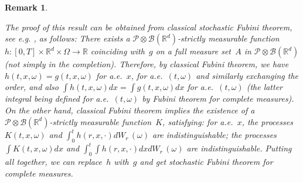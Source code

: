 \documentclass[a4paper,10pt]{article}
\newtheorem{remark}[theorem]{Remark}
\newcommand\1{\mathbbm{1}}
\newcommand{\mr}{\mathbb{R}}
\newcommand{\mc}{\mathcal}
\numberwithin{equation}{section}
\begin{document}
\begin{remark}
\begin{itemize}
\begin{itemize}
\end{itemize}
The proof of this result can be obtained from classical stochastic Fubini theorem, see e.g. \textup{\cite[Theorem~2.2]{VERAAR12}}, as follows: There exists a $\mc{P}\otimes \mc{B}(\mr^d)$-strictly measurable function $h \colon [0,T]\times\mr^d\times\Omega\rightarrow \mr$ coinciding with~$g$ on a full measure set~$A$ in $\mc{P}\otimes \mc{B}(\mr^d)$ \textup{(}not simply in the completion\textup{)}. Therefore, by classical Fubini theorem, we have $h(t,x,\omega)=g(t,x,\omega)$ for a.e.~$x$, for a.e.~$(t,\omega)$ and similarly exchanging the order, and also $\int h(t,x,\omega) dx = \int g(t,x,\omega) d x$ for a.e.~$(t,\omega)$ \textup{(}the latter integral being defined for a.e.~$(t,\omega)$ by Fubini theorem for complete measures\textup{)}. On the other hand, classical Fubini theorem implies the existence of a $\mc{P}\otimes \mc{B}(\mr^d)$-strictly measurable function~$K$, satisfying: for a.e.~$x$, the processes $K(t,x,\omega)$ and $\int^t_0 h(r,x,\cdot) d W_r\,(\omega)$ are indistinguishable; the processes $\int K(t,x,\omega) d x$ and $\int^t_0 \int h(r,x,\cdot) d x d W_r\,(\omega)$ are indistinguishable. Putting all together, we can replace~$h$ with~$g$ and get stochastic Fubini theorem for complete measures.
\end{itemize}
\end{remark}
\end{document}
